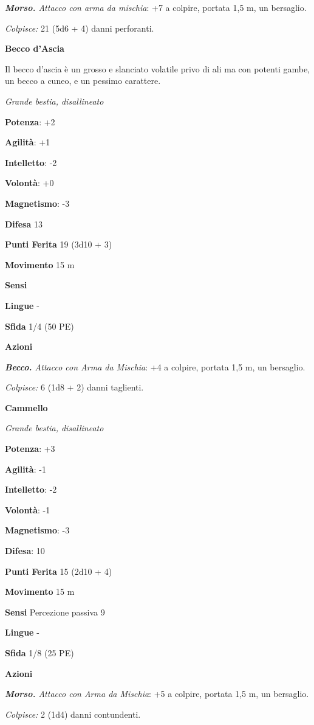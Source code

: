 \begin{multicols}{2}
\emph{\textbf{Morso.} Attacco con arma da mischia}: +7 a colpire,
portata 1,5 m, un bersaglio.

\emph{Colpisce:} 21 (5d6 + 4) danni perforanti.

\textbf{Becco d'Ascia}

Il becco d'ascia è un grosso e slanciato volatile privo di ali ma con
potenti gambe, un becco a cuneo, e un pessimo carattere.

\emph{Grande bestia, disallineato}

\textbf{Potenza}: +2

\textbf{Agilità}: +1

\textbf{Intelletto}: -2

\textbf{Volontà}: +0

\textbf{Magnetismo}: -3

\textbf{Difesa} 13

\textbf{Punti Ferita} 19 (3d10 + 3)

\textbf{Movimento} 15 m

\textbf{Sensi} 

\textbf{Lingue} -

\textbf{Sfida} 1/4 (50 PE)

\textbf{Azioni}

\emph{\textbf{Becco.} Attacco con Arma da Mischia}: +4 a colpire,
portata 1,5 m, un bersaglio.

\emph{Colpisce:} 6 (1d8 + 2) danni taglienti.

\textbf{Cammello}

\emph{Grande bestia, disallineato}

\textbf{Potenza}: +3

\textbf{Agilità}: -1

\textbf{Intelletto}: -2

\textbf{Volontà}: -1

\textbf{Magnetismo}: -3

\textbf{Difesa}: 10

\textbf{Punti Ferita} 15 (2d10 + 4)

\textbf{Movimento} 15 m

\textbf{Sensi} Percezione passiva 9

\textbf{Lingue} -

\textbf{Sfida} 1/8 (25 PE)

\textbf{Azioni}

\emph{\textbf{Morso.} Attacco con Arma da Mischia}: +5 a colpire,
portata 1,5 m, un bersaglio.

\emph{Colpisce:} 2 (1d4) danni contundenti.


\end{multicols}
